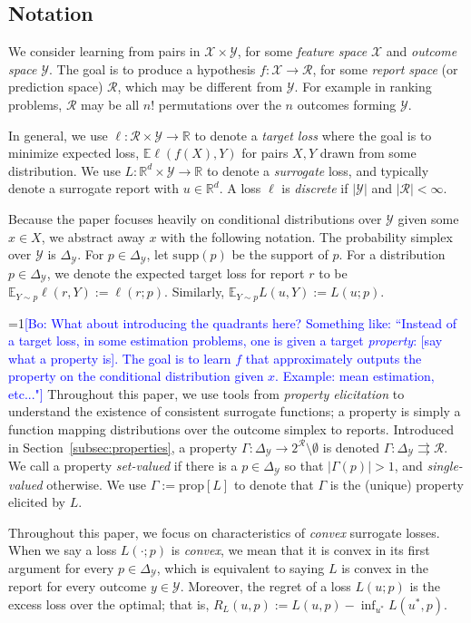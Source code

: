 \documentclass{article}
\newcommand{\Comments}{1}
\newcommand{\mynote}[2]{\ifnum\Comments=1\textcolor{#1}{#2}\fi}
\newcommand{\bo}[1]{\mynote{blue}{[Bo: #1]}}
\newcommand{\reals}{\mathbb{R}}
\newcommand{\simplex}{\Delta_\Y}
\newcommand{\prop}[1]{\mathrm{prop}[#1]}
\newcommand{\supp}{\mathrm{supp}}
\newcommand{\E}{\mathbb{E}}
\newcommand{\R}{\mathcal{R}}
\newcommand{\X}{\mathcal{X}}
\newcommand{\Y}{\mathcal{Y}}
\newcommand{\toto}{\rightrightarrows}
\begin{document}
\subsection{Notation}
We consider learning from pairs in $\X \times \Y$, for some \emph{feature space} $\X$ and \emph{outcome space} $\Y$.
The goal is to produce a hypothesis $f: \X \to \R$, for some \emph{report space} (or prediction space) $\R$, which may be different from $\Y$.
For example in ranking problems, $\R$ may be all $n!$ permutations over the $n$ outcomes forming $\Y$.

In general, we use $\ell: \R \times \Y \to \reals$ to denote a \emph{target loss} where the goal is to minimize expected loss, $\E \ell(f(X),Y)$ for pairs $X,Y$ drawn from some distribution.
We use $L: \reals^d \times \Y \to \reals$ to denote a \emph{surrogate} loss, and typically denote a surrogate report with $u \in \reals^d$.
A loss $\ell$ is \emph{discrete} if $|\Y|$ and $|\R| < \infty$.

Because the paper focuses heavily on conditional distributions over $\Y$ given some $x \in X$, we abstract away $x$ with the following notation.
The probability simplex over $\Y$ is $\simplex$.
For $p \in \simplex$, let $\supp(p)$ be the support of $p$.
For a distribution $p \in \simplex$, we denote the expected target loss for report $r$ to be $\E_{Y \sim p} \ell(r, Y) := \ell(r; p)$.
Similarly, $\E_{Y \sim p} L(u, Y) := L(u ; p)$.

\bo{What about introducing the quadrants here? Something like: ``Instead of a target loss, in some estimation problems, one is given a target \emph{property}: [say what a property is]. The goal is to learn $f$ that approximately outputs the property on the conditional distribution given $x$. Example: mean estimation, etc..."}
Throughout this paper, we use tools from \emph{property elicitation} to understand the existence of consistent surrogate functions; a property is simply a function mapping distributions over the outcome simplex to reports.
Introduced in Section~\ref{subsec:properties}, a property $\Gamma: \simplex \to 2^\R \setminus \emptyset$ is denoted $\Gamma:\simplex \toto \R$.
We call a property \emph{set-valued} if there is a $p \in \simplex$ so that $|\Gamma(p)| > 1$, and \emph{single-valued} otherwise.
We use $\Gamma := \prop{L}$ to denote that $\Gamma$ is the (unique) property elicited by $L$.

Throughout this paper, we focus on characteristics of \emph{convex} surrogate losses.
When we say a loss $L(\cdot; p)$ is \emph{convex}, we mean that it is convex in its first argument for every $p \in \simplex$, which is equivalent to saying $L$ is convex in the report for every outcome $y \in \Y$.
Moreover, the regret of a loss $L(u; p)$ is the excess loss over the optimal; that is, $R_L(u,p) := L(u,p) - \inf_{u^*} L(u^*, p)$.
\end{document}
